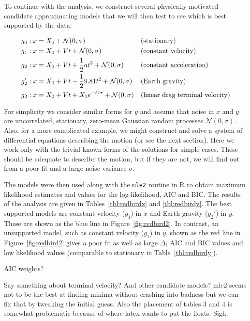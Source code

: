 To continue with the analysis, we construct several physically-motivated candidate approximating models that we will then test to see which is best supported by the data:  

\begin{align}
\notag g_0:  x &= X_0 + \mathcal{N}(0,\sigma)& &\text{(stationary)}\\
\notag g_1:  x &= X_0 + V t + \mathcal{N}(0,\sigma)& &\text{(constant velocity)}\\
\notag g_2:  x &= X_0 + V t + \frac{1}{2}a t^2 + \mathcal{N}(0,\sigma)& &\text{(constant acceleration)}\\
\notag g_2':  x &= X_0 + V t - \frac{1}{2} \num{9.81} t^2 + \mathcal{N}(0,\sigma)& &\text{(Earth gravity)}\\
\notag g_3:  x &= X_0 + V t + X_1 e^{-t/\tau} + \mathcal{N}(0,\sigma)& &\text{(linear drag terminal velocity)}
\end{align}

For simplicity we consider similar forms for $y$ and assume that noise in $x$ and $y$ are uncorrelated, stationary, zero-mean Gaussian random processes $\mathcal{N}(0,\sigma)$.  Also, for a more complicated example, we might construct and solve a system of differential equations describing the motion \cite{Rauch:1965} (or see the next section). Here we work only with the trivial known forms of the solutions for simple cases. These should be adequate to describe the motion, but if they are not, we will find out from a poor fit and a large noise variance $\sigma$. 

The models were then used along with the \texttt{mle2} routine in R to obtain maximum likelihood estimates and values for the log-likelihood, AIC and BIC.  The results of the analysis are given in Tables~\ref{tbl:redbirdx} and \ref{tbl:redbirdy}. The best supported models are constant velocity ($g_1$) in $x$ and Earth gravity ($g_2'$) in $y$.  These are shown as the blue line in Figure~\ref{fig:redbird2}.  In contrast, an unsupported model, such as constant velocity ($g_1$) in $y$, shown as the red line in Figure~\ref{fig:redbird2} gives a poor fit as well as large $\Delta_i$ AIC and BIC values and low likelihood values (comparable to stationary in Table~\ref{tbl:redbirdy}).

AIC weights?

Say something about terminal velocity?  And other candidate models? mle2 seems not to be the best at finding minima without crashing into badness but we can fix that by tweaking the initial guess. Also the placement of tables 3 and 4 is somewhat problematic because of where latex wants to put the floats.  Sigh.

